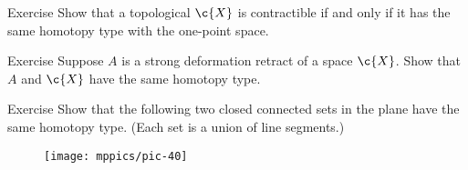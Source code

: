 \begin{thm}{Exercise}
Show that a topological $\c{X}$ is contractible if and only if it has the same homotopy type with the one-point space.
\end{thm}

\begin{thm}{Exercise}
Suppose $A$ is a strong deformation retract of a space $\c{X}$.
Show that $A$ and $\c{X}$ have the same homotopy type.
\end{thm}


\begin{thm}{Exercise}
Show that the following two closed connected sets in the plane have the same homotopy type.
(Each set is a union of line segments.)

\begin{figure}[!ht]
\centering
\texttt{[image: mppics/pic-40]}
\end{figure}
\end{thm}
